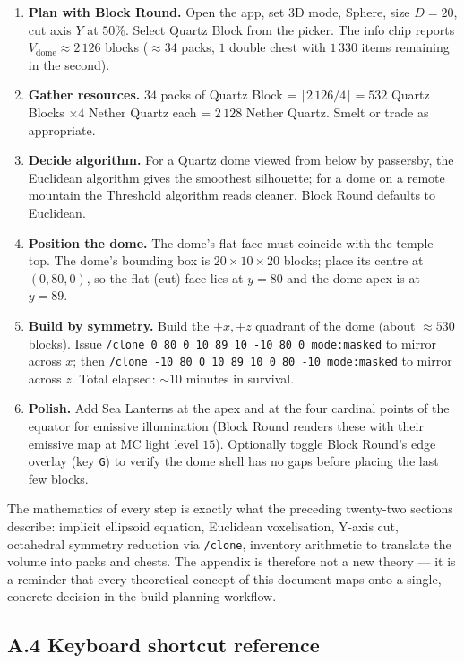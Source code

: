 \documentclass[12pt,a4paper]{scrartcl}
\newcommand{\code}[1]{\texttt{\small #1}}
\newcommand{\cmd}[1]{\textcolor{earth}{\texttt{\small #1}}}
\begin{document}
\begin{enumerate}[leftmargin=1.6em,itemsep=0.3em,topsep=0.3em]
  \item \textbf{Plan with Block Round.} Open the app, set 3D mode, Sphere, size $D=20$, cut axis $Y$ at $50\%$. Select Quartz Block from the picker. The info chip reports $V_{\mathrm{dome}} \approx 2\,126$ blocks ($\approx 34$ packs, $1$ double chest with $1\,330$ items remaining in the second).
  \item \textbf{Gather resources.} $34$ packs of Quartz Block = $\lceil 2\,126/4 \rceil = 532$ Quartz Blocks $\times 4$ Nether Quartz each = $2\,128$ Nether Quartz. Smelt or trade as appropriate.
  \item \textbf{Decide algorithm.} For a Quartz dome viewed from below by passersby, the Euclidean algorithm gives the smoothest silhouette; for a dome on a remote mountain the Threshold algorithm reads cleaner. Block Round defaults to Euclidean.
  \item \textbf{Position the dome.} The dome's flat face must coincide with the temple top. The dome's bounding box is $20 \times 10 \times 20$ blocks; place its centre at $(0,80,0)$, so the flat (cut) face lies at $y=80$ and the dome apex is at $y=89$.
  \item \textbf{Build by symmetry.} Build the $+x, +z$ quadrant of the dome (about $\approx 530$ blocks). Issue \cmd{/clone 0 80 0 10 89 10 -10 80 0 mode:masked} to mirror across $x$; then \cmd{/clone -10 80 0 10 89 10 0 80 -10 mode:masked} to mirror across $z$. Total elapsed: $\sim 10$ minutes in survival.
  \item \textbf{Polish.} Add Sea Lanterns at the apex and at the four cardinal points of the equator for emissive illumination (Block Round renders these with their emissive map at MC light level $15$). Optionally toggle Block Round's edge overlay (key \code{G}) to verify the dome shell has no gaps before placing the last few blocks.
\end{enumerate}

The mathematics of every step is exactly what the preceding twenty-two sections describe: implicit ellipsoid equation, Euclidean voxelisation, Y-axis cut, octahedral symmetry reduction via \cmd{/clone}, inventory arithmetic to translate the volume into packs and chests. The appendix is therefore not a new theory --- it is a reminder that every theoretical concept of this document maps onto a single, concrete decision in the build-planning workflow.

\subsection*{A.4 Keyboard shortcut reference}
\end{document}
